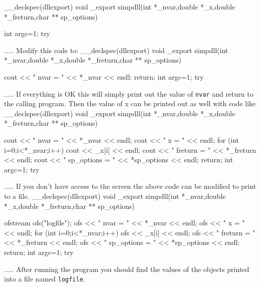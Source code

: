 \beginexample
__declspec(dllexport) void _export simpdll(int *_nvar,double *_x,double *_freturn,char ** sp_options)
{
  int argc=1;
  try {
  .....
\endexample
Modify this code to:
\beginexample
__declspec(dllexport) void _export simpdll(int *_nvar,double *_x,double *_freturn,char ** sp_options)
{
  cout << " nvar = " << *_nvar << endl;
  return; 
  int argc=1;
  try {
   .....
\endexample
If everything is OK this will simply print out the value of {\tt nvar}
and return to the calling program.
Then the value of x can be printed out as well with code like
\beginexample
__declspec(dllexport) void _export simpdll(int *_nvar,double *_x,double *_freturn,char ** sp_options)
{
  cout << " nvar = " << *_nvar << endl;
  cout << " x = " << endl;
  for (int i=0;i<*_nvar;i++)
    cout << _x[i] << endl;
  cout << " freturn = " << *_freturn << endl;
  cout << " sp_options = " << *sp_options << endl;
  return; 
  int argc=1;
  try {
   .....
\endexample
If you don't have access to the screen the above code can be modified to print to a file.
\beginexample
__declspec(dllexport) void _export simpdll(int *_nvar,double *_x,double *_freturn,char ** sp_options)
{
  ofstream ofs("logfile");
  ofs << " nvar = " << *_nvar << endl;
  ofs << " x = " << endl;
  for (int i=0;i<*_nvar;i++)
    ofs << _x[i] << endl;
  ofs << " freturn = " << *_freturn << endl;
  ofs << " sp_options = " << *sp_options << endl;
  return; 
  int argc=1;
  try {
   .....
\endexample
After running the program you should find the values of the 
objects printed into a file named {\tt logfile}.

}}}}}}}}
